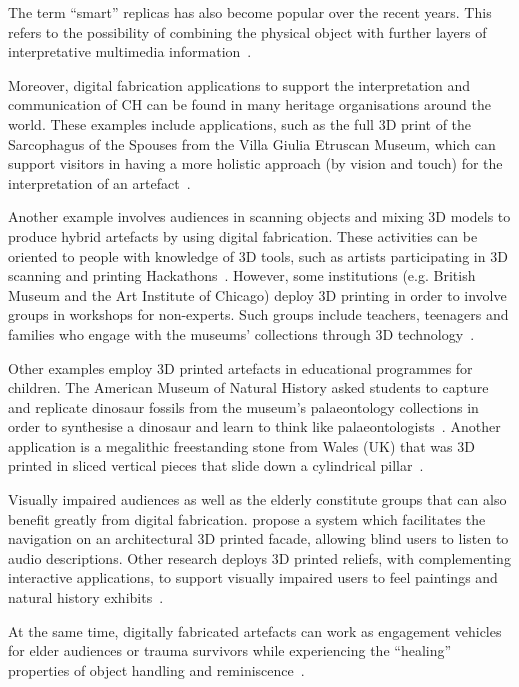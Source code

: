 \documentclass[acmlarge,screen,dvipsnames]{acmart}
\begin{document}
The term ``smart'' replicas has also become popular over the recent
years. This refers to the possibility of combining the physical object
with further layers of interpretative multimedia
information~\cite{Capurro2015,Marshall2016}.

Moreover, digital fabrication applications to support the
interpretation and communication of CH can be found in many heritage
organisations around the world. These examples include applications,
such as the full 3D print of the Sarcophagus of the Spouses from the
Villa Giulia Etruscan Museum, which can support visitors in having a
more holistic approach (by vision and touch) for the interpretation of
an artefact~\cite{Guidazzoli2014}.

Another example involves audiences in scanning objects and mixing 3D
models to produce hybrid artefacts by using digital fabrication. These
activities can be oriented to people with knowledge of 3D tools, such
as artists participating in 3D scanning and printing
Hackathons~\cite{Mullaney2012,Neely2013}. However, some institutions
(e.g. British Museum and the Art Institute of Chicago) deploy 3D
printing in order to involve groups in workshops for non-experts. Such
groups include teachers, teenagers and families who engage with the
museums' collections through 3D
technology~\cite{BritishMuseum2016,Neely2015,Miles2015}.

Other examples employ 3D printed artefacts in educational programmes
for children. The American Museum of Natural History asked students to
capture and replicate dinosaur fossils from the museum's palaeontology
collections in order to synthesise a dinosaur and learn to think like
palaeontologists~\cite{AMNH2013}. Another application is a megalithic
freestanding stone from Wales (UK) that was 3D printed in sliced
vertical pieces that slide down a cylindrical pillar~\cite{Miles2015}.

Visually impaired audiences as well as the elderly constitute groups
that can also benefit greatly from digital
fabrication. \cite{DAgnano2015} propose a system which facilitates
the navigation on an architectural 3D printed facade, allowing blind
users to listen to audio descriptions. Other research deploys 3D
printed reliefs, with complementing interactive applications, to
support visually impaired users to feel paintings and natural history
exhibits~\cite{Reichinger2016a,Samaroudi2017}.

At the same time, digitally fabricated artefacts can work as
engagement vehicles for elder audiences or trauma survivors while
experiencing the ``healing'' properties of object handling and
reminiscence~\cite{PleaseTouch2016}.
\end{document}
